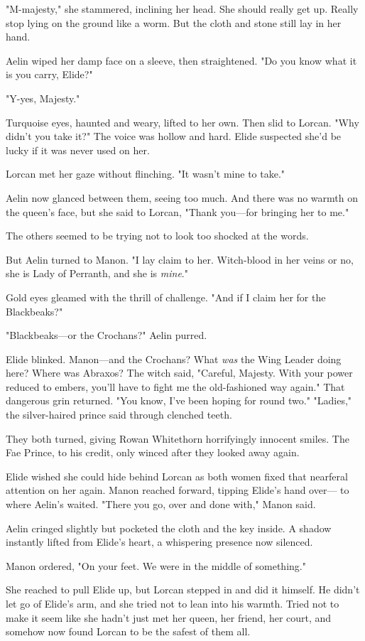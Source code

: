 "M-majesty," she stammered, inclining her head. She should really get up. Really stop lying on the ground like a worm. But the cloth and stone still lay in her hand.

Aelin wiped her damp face on a sleeve, then straightened. "Do you know what it is you carry, Elide?"

"Y-yes, Majesty."

Turquoise eyes, haunted and weary, lifted to her own. Then slid to Lorcan. "Why didn't you take it?" The voice was hollow and hard. Elide suspected she'd be lucky if it was never used on her.

Lorcan met her gaze without flinching. "It wasn't mine to take."

Aelin now glanced between them, seeing too much. And there was no warmth on the queen's face, but she said to Lorcan, "Thank you---for bringing her to me."

The others seemed to be trying not to look too shocked at the words.

But Aelin turned to Manon. "I lay claim to her. Witch-blood in her veins or no, she is Lady of Perranth, and she is \emph{mine}."

Gold eyes gleamed with the thrill of challenge. "And if I claim her for the Blackbeaks?"

"Blackbeaks---or the Crochans?" Aelin purred.

Elide blinked. Manon---and the Crochans? What \emph{was} the Wing Leader doing here? Where was Abraxos? The witch said, "Careful, Majesty. With your power reduced to embers, you'll have to fight me the old-fashioned way again." That dangerous grin returned. "You know, I've been hoping for round two." "Ladies," the silver-haired prince said through clenched teeth.

They both turned, giving Rowan Whitethorn horrifyingly innocent smiles. The Fae Prince, to his credit, only winced after they looked away again.

Elide wished she could hide behind Lorcan as both women fixed that nearferal attention on her again. Manon reached forward, tipping Elide's hand over--- to where Aelin's waited. "There you go, over and done with," Manon said.

Aelin cringed slightly but pocketed the cloth and the key inside. A shadow instantly lifted from Elide's heart, a whispering presence now silenced.

Manon ordered, "On your feet. We were in the middle of something."

She reached to pull Elide up, but Lorcan stepped in and did it himself. He didn't let go of Elide's arm, and she tried not to lean into his warmth. Tried not to make it seem like she hadn't just met her queen, her friend, her court, and  somehow now found Lorcan to be the safest of them all.

